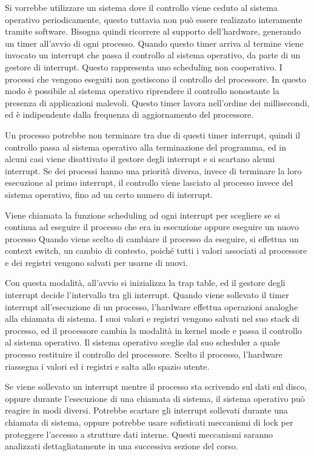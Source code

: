 \documentclass{article}
\numberwithin{equation}{subsection}
\begin{document}
Si vorrebbe utilizzare un sistema dove il controllo viene ceduto al sistema operativo periodicamente, questo tuttavia non può essere realizzato interamente tramite 
software. Bisogna quindi ricorrere al supporto dell'hardware, generando un timer all'avvio di ogni processo. Quando questo timer arriva al termine viene invocato un 
interrupt che passa il controllo al sistema operativo, da parte di un gestore di interrupt. Questo rappresenta uno scheduling non cooperativo. I 
processi che vengono eseguiti non gestiscono il controllo del processore. In questo modo è possibile al sistema operativo riprendere il controllo nonostante la presenza 
di applicazioni malevoli. Questo timer lavora nell'ordine dei millisecondi, ed è indipendente dalla frequenza di aggiornamento del processore. 

Un processo potrebbe non terminare tra due di questi timer interrupt, quindi il controllo passa al sistema operativo alla terminazione del programma, ed in alcuni casi 
viene disattivato il gestore degli interrupt e si scartano alcuni interrupt. Se dei processi hanno una priorità diversa, invece di terminare la loro esecuzione al primo 
interrupt, il controllo viene lasciato al processo invece del sistema operativo, fino ad un certo numero di interrupt. 

Viene chiamata la funzione scheduling ad ogni interrupt per scegliere se si continua ad eseguire il processo che era in esecuzione oppure eseguire un nuovo processo
Quando viene scelto di cambiare il processo da eseguire, si effettua un context switch, un cambio di contesto, poiché tutti i valori associati al processore e dei registri 
vengono salvati per usarne di nuovi. 



Con questa modalità, all'avvio si inizializza la trap table, ed il gestore degli interrupt decide l'intervallo tra gli interrupt. Quando viene sollevato il timer 
interrupt all'esecuzione di un processo, l'hardware effettua operazioni analoghe alla chiamata di sistema. I suoi valori e registri vengono salvati nel suo stack di 
processo, ed il processore cambia la modalità in kernel mode e passa il controllo al sistema operativo. Il sistema operativo sceglie dal suo scheduler a quale processo 
restituire il controllo del processore. Scelto il processo, l'hardware riassegna i valori ed i registri e salta allo spazio utente. 

Se viene sollevato un interrupt mentre il processo sta scrivendo sul dati sul disco, oppure durante l'esecuzione di una chiamata di sistema, il sistema operativo può reagire in modi 
diversi. Potrebbe scartare gli interrupt sollevati durante una chiamata di sistema, oppure potrebbe usare sofisticati meccanismi di lock per proteggere l'accesso a 
strutture dati interne. Questi meccanismi saranno analizzati dettagliatamente in una successiva sezione del corso. 
\end{document}
